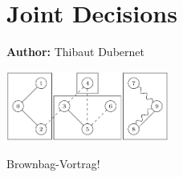 \chapter{Joint Decisions }
\label{ch:jointtrips}

\hfill \textbf{Author:} Thibaut Dubernet

\begin{center} \includegraphics[width=0.4\textwidth, angle=0]{extending/figures/Jointtrips/group.png} \end{center}


Brownbag-Vortrag!

\citet[][]{DubernetAxhausen_unpub_Frontiers_2013, DubernetAxhausen_unpub_SmartCities_2013, DubernetAxhausen_STRC_2014}

